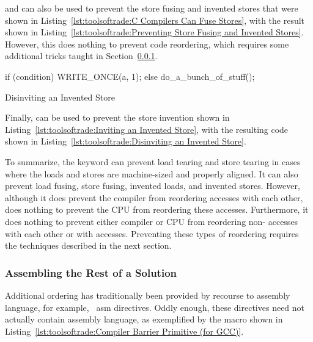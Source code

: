  and  can also be used to prevent the
store fusing and invented stores that were shown in
Listing~\ref{lst:toolsoftrade:C Compilers Can Fuse Stores},
with the result shown in
Listing~\ref{lst:toolsoftrade:Preventing Store Fusing and Invented Stores}.
However, this does nothing to prevent code reordering, which requires
some additional tricks taught in
Section~\ref{sec:toolsoftrade:Assembling the Rest of a Solution}.

\begin{listing}[tbp]
\begin{linelabel}
\begin{VerbatimL}[commandchars=\\\{\}]
if (condition)
	WRITE_ONCE(a, 1);
else
	do_a_bunch_of_stuff();
\end{VerbatimL}
\end{linelabel}
\caption{Disinviting an Invented Store}
\label{lst:toolsoftrade:Disinviting an Invented Store}
\end{listing}

Finally,  can be used to prevent the store invention
shown in
Listing~\ref{lst:toolsoftrade:Inviting an Invented Store},
with the resulting code shown in
Listing~\ref{lst:toolsoftrade:Disinviting an Invented Store}.

To summarize, the  keyword can prevent load
tearing and store tearing in cases where the loads and stores are
machine-sized and properly aligned.
It can also prevent load fusing, store fusing, invented loads, and
invented stores.
However, although it does prevent the compiler from reordering 
accesses with each other, does nothing to prevent the CPU from reordering
these accesses.
Furthermore, it does nothing to prevent either compiler or CPU from
reordering non- accesses with each other or with
 accesses.
Preventing these types of reordering requires the techniques described
in the next section.

\subsubsection{Assembling the Rest of a Solution}
\label{sec:toolsoftrade:Assembling the Rest of a Solution}

Additional ordering has traditionally been provided by recourse to
assembly language, for example, \GCC\ asm directives.
Oddly enough, these directives need not actually contain assembly language,
as exemplified by the  macro shown in
Listing~\ref{lst:toolsoftrade:Compiler Barrier Primitive (for GCC)}.

